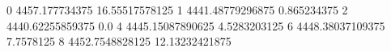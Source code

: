 0 4457.177734375 16.55517578125
1 4441.48779296875 0.865234375
2 4440.62255859375 0.0
4 4445.15087890625 4.5283203125
6 4448.38037109375 7.7578125
8 4452.7548828125 12.13232421875
